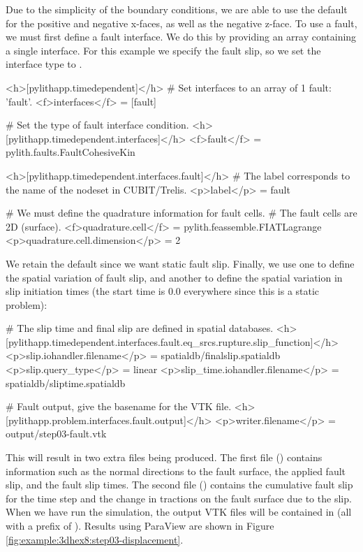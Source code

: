 Due to the simplicity of the boundary conditions, we are able to use
the default  for the positive and negative x-faces,
as well as the negative z-face. To use a fault, we must first define
a fault interface. We do this by providing an array containing a single
interface. For this example we specify the fault slip, so we set the interface
type to .
\begin{cfg}
<h>[pylithapp.timedependent]</h>
# Set interfaces to an array of 1 fault: 'fault'.
<f>interfaces</f> = [fault] 

# Set the type of fault interface condition.
<h>[pylithapp.timedependent.interfaces]</h>
<f>fault</f> = pylith.faults.FaultCohesiveKin 

<h>[pylithapp.timedependent.interfaces.fault]</h>
# The label corresponds to the name of the nodeset in CUBIT/Trelis.
<p>label</p> = fault

# We must define the quadrature information for fault cells.
# The fault cells are 2D (surface).
<f>quadrature.cell</f> = pylith.feassemble.FIATLagrange
<p>quadrature.cell.dimension</p> = 2 
\end{cfg}
We retain the default  since we want static fault
slip. Finally, we use one  to define the spatial
variation of fault slip, and another  to define the
spatial variation in slip initiation times (the start time is 0.0
everywhere since this is a static problem):
\begin{cfg}
# The slip time and final slip are defined in spatial databases.
<h>[pylithapp.timedependent.interfaces.fault.eq\_srcs.rupture.slip\_function]</h>
<p>slip.iohandler.filename</p> = spatialdb/finalslip.spatialdb
<p>slip.query_type</p> = linear
<p>slip_time.iohandler.filename</p> = spatialdb/sliptime.spatialdb 

# Fault output, give the basename for the VTK file.
<h>[pylithapp.problem.interfaces.fault.output]</h>
<p>writer.filename</p> = output/step03-fault.vtk 
\end{cfg}
This will result in two extra files being produced. The first file
() contains information such as the
normal directions to the fault surface, the applied fault slip, and
the fault slip times. The second file
() contains the cumulative fault
slip for the time step and the change in tractions on the fault
surface due to the slip. When we have run the simulation, the output
VTK files will be contained in  (all
with a prefix of ). Results using ParaView are shown
in Figure \vref{fig:example:3dhex8:step03-displacement}.

